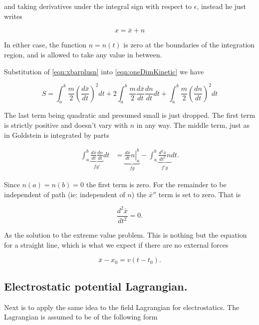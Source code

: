 \documentclass{article}
\begin{document}
and taking derivatives under the integral sign with respect to $\epsilon$, instead he just writes

\begin{equation}\label{eqn:xbarplusn}
x = \bar{x} + n
\end{equation}

In either case, the function $n = n(t)$ is zero at the boundaries of the integration region, and is allowed to take any value in between.

Substitution of \ref{eqn:xbarplusn} into \ref{eqn:oneDimKinetic} we have

\begin{equation}
S =
\int_a^b \frac{m}{2} { \left(\frac{d\bar{x}}{dt}\right) }^2 dt
+ 2 \int_a^b \frac{m}{2} \frac{d\bar{x}}{dt} \frac{d n}{dt} dt
+ \int_a^b \frac{m}{2} { \left(\frac{d n}{dt}\right) }^2 dt
\end{equation}

The last term being quadratic and presumed small is just dropped.  The first term is strictly positive and doesn't vary with $n$ in any way.  The middle term, just as in
Goldstein is integrated by parts

\begin{align*}
\int_a^b \underbrace{ \frac{d\bar{x}}{dt} \frac{d n}{dt} }_{fg'} dt
&= \underbrace{ \left. \frac{d\bar{x}}{dt} n \right\vert_a^b }_{fg} - \int_a^b \underbrace{\frac{d^2\bar{x}}{dt^2} n}_{f'g} dt.
\end{align*}

Since $n(a) = n(b) = 0$ the first term is zero.  For the remainder to be independent of path (ie: independent of $n$) the $\bar{x}''$ term is set to zero.  That is

\begin{equation*}
\frac{d^2\bar{x}}{dt^2} = 0.
\end{equation*}

As the solution to the extreme value problem.  This is nothing but the equation for a straight line, which is what we expect if there are no external forces

\begin{equation*}
\bar{x} - x_0 = v(t - t_0).
\end{equation*}

\subsection{ Electrostatic potential Lagrangian. }

Next is to apply the same idea to the field Lagrangian for electrostatics.  The Lagrangian is assumed to be of the following form
\end{document}
